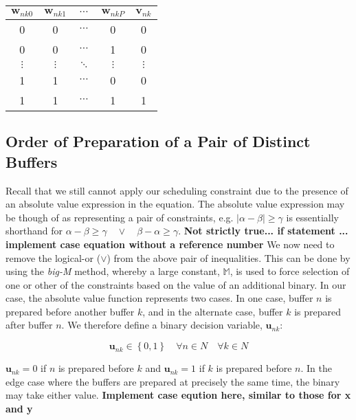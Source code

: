 \begin{center}
    \begin{tabular}{c c c c | c}
        $\boldsymbol{w}_{nk0}$ & $\boldsymbol{w}_{nk1}$ & $\cdots$
        & $\boldsymbol{w}_{nkP}$ & $\boldsymbol{v}_{nk}$ \\ \hline
        0 & 0 & $\cdots$ & 0 & 0\\
        0 & 0 & $\cdots$ & 1 & 0\\
        $\vdots$ & $\vdots$ & $\ddots$ & $\vdots$ & $\vdots$\\
        1 & 1 & $\cdots$ & 0 & 0\\
        1 & 1 & $\cdots$ & 1 & 1\\
    \end{tabular}
\end{center}

\subsection{Order of Preparation of a Pair of Distinct Buffers}\label{SS.constr8}

Recall that we still cannot apply our scheduling constraint due to the presence
of an absolute value expression in the equation.
The absolute value expression may be though of as representing a pair of 
constraints, e.g.
$ \lvert \alpha - \beta \rvert \ge \gamma $
is essentially shorthand for
$ \alpha - \beta \ge \gamma \quad \lor \quad \beta - \alpha \ge \gamma $. 
\textbf{Not strictly true... if statement ... implement case equation without
a reference number}
We now need to remove the logical-or ($\lor$) from the above pair of
inequalities.
This can be done by using the \emph{big-M} method, whereby a large constant,
$ \mathbb{M} $, is used to force selection of one or other of the constraints
based on the value of an additional binary.
In our case, the absolute value function represents two cases.
In one case, buffer $n$ is prepared before another buffer $k$, and in the
alternate case, buffer $k$ is prepared after buffer $n$.
We therefore define a binary decision variable, $\boldsymbol{u}_{nk}$:

\begin{equation}
    \boldsymbol{u}_{nk} \in \left\{ 0, 1 \right\} \quad \forall n \in N \quad
    \forall k \in N
    \label{eq.u}
\end{equation}

$ \boldsymbol{u}_{nk} = 0 $ if $n$ is prepared before $k$ and
$ \boldsymbol{u}_{nk} = 1 $ if $k$ is prepared before $n$.
In the edge case where the buffers are prepared at precisely the same time,
the binary may take either value.
\textbf{Implement case eqution here, similar to those for x and y}


